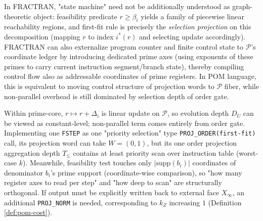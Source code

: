 \begin{remark}\label{rem:pom-fractran-controlflow}
In FRACTRAN, "state machine" need not be additionally understood as graph-theoretic object: feasibility predicate \(r\ge \beta_i\) yields a family of piecewise linear reachability regions, and first-fit rule is precisely the \emph{selection projection} on this decomposition (mapping \(r\) to index \(i^\ast(r)\) and selecting update accordingly).
FRACTRAN can also externalize program counter and finite control state to \(\mathcal{P}\)'s coordinate ledger by introducing dedicated prime axes (using exponents of these primes to carry current instruction segment/branch state), thereby compiling control flow also as addressable coordinates of prime registers.
In POM language, this is equivalent to moving control structure of projection words to \(\mathcal{P}\) fiber, while non-parallel overhead is still dominated by selection depth of order gate.
\end{remark}

\begin{remark}\label{rem:pom-fractran-cost}
Within prime-core, \(r\mapsto r+\Delta_i\) is linear update on \(\mathcal{P}\), so evolution depth \(D_U\) can be viewed as constant-level; non-parallel term comes entirely from order gate.
Implementing one \texttt{FSTEP} as one "priority selection" type \texttt{PROJ\_ORDER(first-fit)} call, its projection word can take \(W=(0,1)\), but its one order projection aggregation depth \(T_{\le}\) contains at least priority scan over instruction table (worst-case \(k\)).
Meanwhile, feasibility test touches only \(|\mathrm{supp}(b_i)|\) coordinates of denominator \(b_i\)'s prime support (coordinate-wise comparison), so "how many register axes to read per step" and "how deep to scan" are structurally orthogonal.
If output must be explicitly written back to external face \(X_\infty\), an additional \texttt{PROJ\_NORM} is needed, corresponding to \(k_Z\) increasing \(1\) (Definition \ref{def:pom-cost}).
\end{remark}

